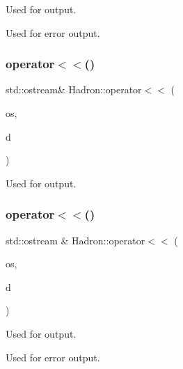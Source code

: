 Used for output. 

Used for error output. \mbox{\label{namespaceHadron_a0bf650d748bab6ca6ae6a8d49dd44124}} 
\subsubsection{\texorpdfstring{operator$<$$<$()}{operator<<()}\hspace{0.1cm}{\footnotesize\ttfamily [31/48]}}
{\footnotesize\ttfamily std\+::ostream\& Hadron\+::operator$<$$<$ (\begin{DoxyParamCaption}\item[{std\+::ostream \&}]{os,  }\item[{const \mbox{\hyperlink{classADAT_1_1Array1dO}{Array1dO}}$<$ \mbox{\hyperlink{structHadron_1_1KeyHadronNode__t_1_1Quark__t}{Key\+Hadron\+Node\+\_\+t\+::\+Quark\+\_\+t}} $>$ \&}]{d }\end{DoxyParamCaption})}



Used for output. 

\mbox{\label{namespaceHadron_a6d4dd7ed7a6efa27888f4ea9bdd20e51}} 
\subsubsection{\texorpdfstring{operator$<$$<$()}{operator<<()}\hspace{0.1cm}{\footnotesize\ttfamily [32/48]}}
{\footnotesize\ttfamily std\+::ostream \& Hadron\+::operator$<$$<$ (\begin{DoxyParamCaption}\item[{std\+::ostream \&}]{os,  }\item[{const \mbox{\hyperlink{structHadron_1_1KeyHadronNPartIrrepOp__t}{Key\+Hadron\+N\+Part\+Irrep\+Op\+\_\+t}} \&}]{d }\end{DoxyParamCaption})}



Used for output. 

Used for error output. \mbox{\label{namespaceHadron_a4347887ac461374a85fd726b7dece87c}} 
